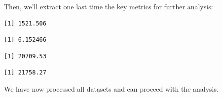 Then, we'll extract one last time the key metrics for further analysis:

\begin{Shaded}
\begin{Highlighting}[]
\SpecialCharTok{\$}
\end{Highlighting}
\end{Shaded}

\begin{verbatim}
[1] 1521.506
\end{verbatim}

\begin{Shaded}
\begin{Highlighting}[]
\SpecialCharTok{\$}
\end{Highlighting}
\end{Shaded}

\begin{verbatim}
[1] 6.152466
\end{verbatim}

\begin{Shaded}
\begin{Highlighting}[]
\SpecialCharTok{\$}
\end{Highlighting}
\end{Shaded}

\begin{verbatim}
[1] 20709.53
\end{verbatim}

\begin{Shaded}
\begin{Highlighting}[]
\SpecialCharTok{\$}
\end{Highlighting}
\end{Shaded}

\begin{verbatim}
[1] 21758.27
\end{verbatim}

We have now processed all datasets and can proceed with the analysis.
